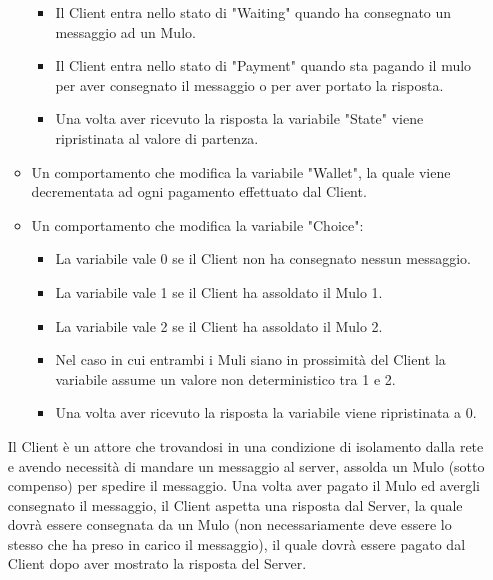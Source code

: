 \documentclass[13pt,a4paper]{article}
\begin{document}
\begin{itemize}
\begin{itemize}
\begin{itemize}
				\item Il Client entra nello stato di "Waiting" quando ha consegnato un messaggio ad un Mulo. 
				\item Il Client entra nello stato di "Payment" quando sta pagando il mulo per aver consegnato il messaggio o per aver portato la risposta.
				\item Una volta aver ricevuto la risposta la variabile "State" viene ripristinata al valore di partenza.
			\end{itemize}
			\item Un comportamento che modifica la variabile "Wallet", la quale viene decrementata ad ogni pagamento effettuato dal Client.
			\item Un comportamento che modifica la variabile "Choice":
			\begin{itemize}
				\item La variabile vale 0 se il Client non ha consegnato nessun messaggio.
				\item La variabile vale 1 se  il Client ha assoldato il Mulo 1.
				\item La variabile vale 2 se  il Client ha assoldato il Mulo 2.
				\item Nel caso in cui entrambi i Muli siano in prossimità del Client la variabile assume un valore non deterministico tra 1 e 2.
				\item Una volta aver ricevuto la risposta la variabile viene ripristinata a 0.
			\end{itemize}
		\end{itemize}
		Il Client  è un attore che trovandosi in una condizione di isolamento dalla rete e avendo necessità di mandare un messaggio al server, assolda un Mulo (sotto compenso) per spedire il messaggio. Una volta aver pagato il Mulo ed avergli consegnato il messaggio, il Client aspetta una risposta dal Server, la quale dovrà essere consegnata da un Mulo (non necessariamente deve essere lo stesso che ha preso in carico il messaggio), il quale dovrà essere pagato dal Client dopo aver mostrato la risposta del Server.
		

\end{itemize}
\end{document}
